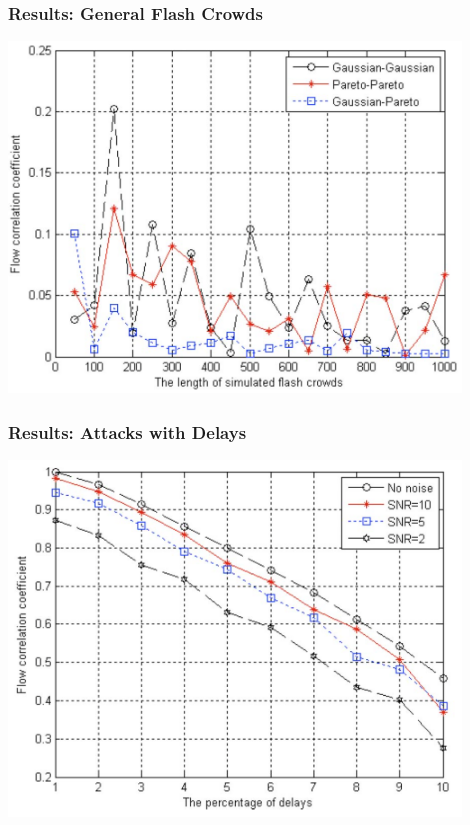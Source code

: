 \documentclass[10pt,mathserif]{beamer}
\begin{document}
\begin{frame}
  \frametitle{Results: General Flash Crowds}
  \includegraphics[width=0.9\textwidth,natwidth=1008,natheight=782]{figures/gen_flash_crowds.png}
\end{frame}

\begin{frame}
  \frametitle{Results: Attacks with Delays}
  \includegraphics[width=0.9\textwidth,natwidth=1012,natheight=796]{figures/attack_delay.png}
\end{frame}
\end{document}
